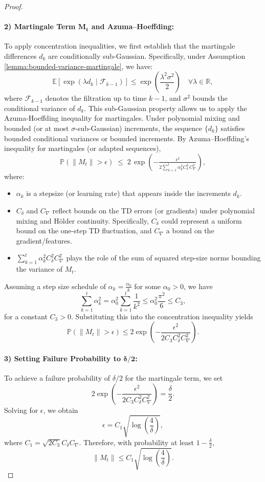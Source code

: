 \begin{proof}
\paragraph{2) Martingale Term \(\boldsymbol{M_t}\) and Azuma--Hoeffding:}
To apply concentration inequalities, we first establish that the martingale differences \(d_k\) are conditionally sub-Gaussian. Specifically, under Assumption \ref{lemma:bounded-variance-martingale}, we have:
\[
\mathbb{E}\left[\exp\left(\lambda d_k \mid \mathcal{F}_{k-1}\right)\right] \leq \exp\left(\frac{\lambda^2 \sigma^2}{2}\right) \quad \forall \lambda \in \mathbb{R},
\]
where \(\mathcal{F}_{k-1}\) denotes the filtration up to time \(k-1\), and \(\sigma^2\) bounds the conditional variance of \(d_k\). This sub-Gaussian property allows us to apply the Azuma-Hoeffding inequality for martingales.
Under polynomial mixing and bounded (or at most $\sigma$-sub-Gaussian) increments, the sequence $\{d_k\}$ satisfies bounded conditional variances or bounded increments. By Azuma--Hoeffding's inequality for martingales (or adapted sequences),
\[\displaystyle
  \mathbb{P}\left(
    \bigl\|M_t\bigr\| > \epsilon
  \right)
  \;\le\;
  2
  \,\exp\left(-\tfrac{\displaystyle \epsilon^2}{\displaystyle 2\sum_{k=1}^t \alpha_k^2 C_\delta^2\,C_\nabla^2}\right),
\]
where:
\begin{itemize}
  \item \(\alpha_k\) is a stepsize (or learning rate) that appears inside the increments $d_k$.  
  \item $C_\delta$ and $C_\nabla$ reflect bounds on the TD errors (or gradients) under polynomial mixing and H\"older continuity. Specifically, $C_\delta$ could represent a uniform bound on the one-step TD fluctuation, and $C_\nabla$ a bound on the gradient/features.  
  \item $\sum_{k=1}^t \alpha_k^2 C_\delta^2 C_\nabla^2$ plays the role of the sum of squared step-size norms bounding the variance of $M_t$.  
\end{itemize}

Assuming a step size schedule of \(\alpha_k = \frac{\alpha_0}{k}\) for some \(\alpha_0 > 0\), we have
\[
\sum_{k=1}^t \alpha_k^2 = \alpha_0^2 \sum_{k=1}^t \frac{1}{k^2} \leq \alpha_0^2 \frac{\pi^2}{6} \leq C_3,
\]
for a constant \(C_3 > 0\). Substituting this into the concentration inequality yields
\[
\mathbb{P}\left( \|M_t\| > \epsilon \right) \leq 2 \exp\left(-\frac{\epsilon^2}{2 C_3 C_\delta^2 C_\nabla^2}\right).
\]

\paragraph{3) Setting Failure Probability to $\boldsymbol{\delta/2}$:}
To achieve a failure probability of \(\delta/2\) for the martingale term, we set
\[
2 \exp\left(-\frac{\epsilon^2}{2 C_3 C_\delta^2 C_\nabla^2}\right) = \frac{\delta}{2}.
\]
Solving for \(\epsilon\), we obtain
\[
\epsilon = C_1 \sqrt{\log\left(\frac{4}{\delta}\right)},
\]
where \(C_1 = \sqrt{2 C_3} C_\delta C_\nabla\). Therefore, with probability at least \(1 - \frac{\delta}{2}\),
\[
\|M_t\| \leq C_1 \sqrt{\log\left(\frac{4}{\delta}\right)}.
\]


\end{proof}
